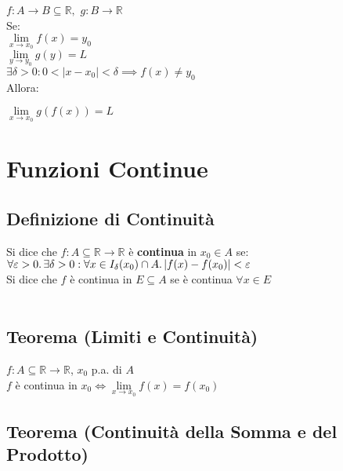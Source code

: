 \documentclass[a4paper, twoside, italian, 11pt]{book}
\newcommand{\abs}[1] {\left | #1 \right |}
\newcommand{\R}{\mathbb{R}}
\begin{document}
\noindent
$f : A \rightarrow B \subseteq \R,$ $g : B \rightarrow \R$ \\

\noindent
Se: \\

$\lim\limits_{x \to x_0} f(x) = y_0$ \\

$\lim\limits_{y \to y_0} g(y) = L$ \\

$\exists \delta > 0 : 0 < \abs{x - x_0} < \delta \implies f(x) \neq y_0$ \\

\noindent
Allora:

\noindent
$\lim\limits_{x \to x_0} g(f(x)) = L$



\chapter{Funzioni Continue}



\section{Definizione di Continuità}

\noindent
Si dice che $f : A \subseteq \R \rightarrow \R$ è \textbf{continua} in $x_0 \in A$ se: \\

$\forall \varepsilon > 0 \ldotp \exists \delta > 0 : \forall x \in I_\delta(x_0) \cap A \ldotp \abs{f(x) - f(x_0)} < \varepsilon$ \\

\noindent
Si dice che $f$ è continua in $E \subseteq A$ se è continua $\forall x \in E$ \\\\



\section{Teorema (Limiti e Continuità)}

\noindent
$f : A \subseteq \R \rightarrow \R$, $x_0$ p.a. di $A$ \\

\noindent
$f$ è continua in $x_0 \iff \lim\limits_{x \to x_0} f(x) = f(x_0)$



\section{Teorema (Continuità della Somma e del Prodotto)}
\end{document}
